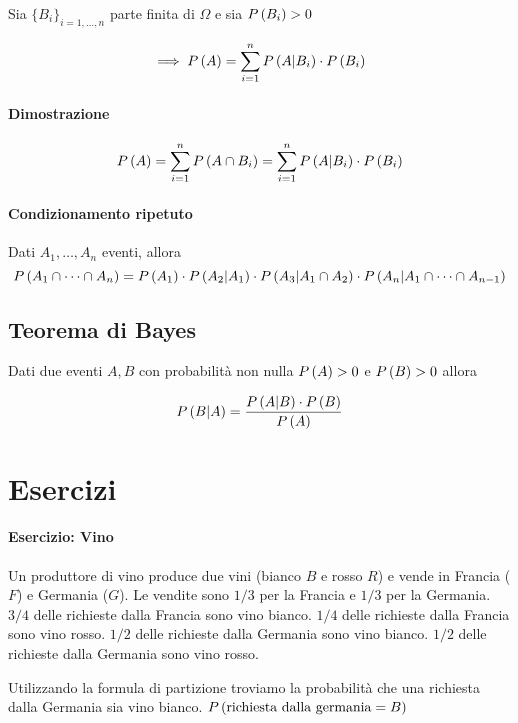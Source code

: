 Sia $ \{B_i\}_{i=1, \dots, n} $ parte finita di $ \Omega $ e sia $ P\left(B_i\right) > 0 $

\[ \implies  P\left(A\right) = \sum_{i=1}^{n} P\left(A|B_i\right) \cdot P\left(B_i\right) \]

\paragraph{Dimostrazione} 

\[ P\left(A\right) =  \sum_{i=1}^{n} P\left(A \cap B_i\right) = \sum_{i=1}^{n} P\left(A|B_i\right) \cdot P\left(B_i\right) \]

\paragraph{Condizionamento ripetuto}
Dati $ A_1, \dots, A_n $ eventi, allora 
\[ P\left(A_1 \cap \dots \cap A_n\right) = P\left(A_1\right) \cdot P\left(A_2|A_1\right) \cdot P\left(A_3| A_1 \cap A_2\right) \cdot P\left(A_n | A_1 \cap \dots \cap A_{n-1}\right)\]

\subsection{Teorema di Bayes}


Dati due eventi $ A,B $ con probabilità non nulla $ P\left(A\right) > 0 $ e $ P\left(B\right) > 0 $ allora 

\[ P\left(B|A\right) = \dfrac{P\left(A|B\right) \cdot P\left(B\right) }{P\left(A\right)}\]


\section{Esercizi}

\paragraph{Esercizio: Vino}

Un produttore di vino produce due vini (bianco $ B $ e rosso $ R $) e vende in Francia ($ F $) e Germania ($ G $). 
Le vendite sono $ 1/3 $ per la Francia e $ 1/3 $ per la Germania. $ 3/4 $ delle richieste dalla Francia sono vino bianco. $ 1/4 $ delle richieste dalla Francia sono vino rosso. $ 1/2 $ delle richieste dalla Germania sono vino bianco. $ 1/2 $ delle richieste dalla Germania sono vino rosso.

Utilizzando la formula di partizione troviamo la probabilità che una richiesta dalla Germania sia vino bianco. $ P\left(\text{richiesta dalla germania} = B\right) $

